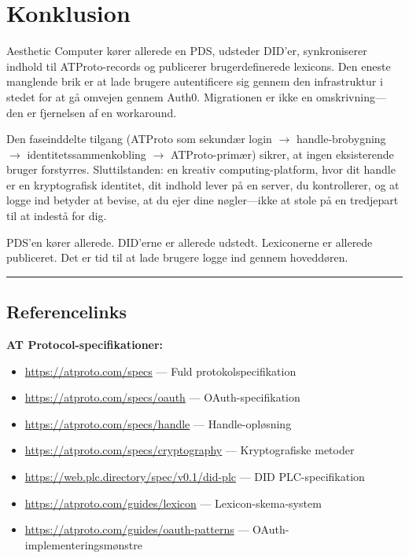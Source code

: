 \documentclass[10pt,letterpaper,twocolumn]{article}
\begin{document}
\section{Konklusion}

Aesthetic Computer kører allerede en PDS, udsteder DID'er, synkroniserer indhold til ATProto-records og publicerer brugerdefinerede lexicons. Den eneste manglende brik er at lade brugere autentificere sig gennem den infrastruktur i stedet for at gå omvejen gennem Auth0. Migrationen er ikke en omskrivning---den er fjernelsen af en workaround.

Den faseinddelte tilgang (ATProto som sekundær login $\to$ handle-brobygning $\to$ identitetssammenkobling $\to$ ATProto-primær) sikrer, at ingen eksisterende bruger forstyrres. Sluttilstanden: en kreativ computing-platform, hvor dit handle er en kryptografisk identitet, dit indhold lever på en server, du kontrollerer, og at logge ind betyder at bevise, at du ejer dine nøgler---ikke at stole på en tredjepart til at indestå for dig.

PDS'en kører allerede. DID'erne er allerede udstedt. Lexiconerne er allerede publiceret. Det er tid til at lade brugere logge ind gennem hoveddøren.


\vspace{0.5em}
\noindent\rule{\columnwidth}{0.5pt}

\subsection*{Referencelinks}

\noindent\small

\textbf{AT Protocol-specifikationer:}
\begin{itemize}
  \item \url{https://atproto.com/specs} --- Fuld protokolspecifikation
  \item \url{https://atproto.com/specs/oauth} --- OAuth-specifikation
  \item \url{https://atproto.com/specs/handle} --- Handle-opløsning
  \item \url{https://atproto.com/specs/cryptography} --- Kryptografiske metoder
  \item \url{https://web.plc.directory/spec/v0.1/did-plc} --- DID PLC-specifikation
  \item \url{https://atproto.com/guides/lexicon} --- Lexicon-skema-system
  \item \url{https://atproto.com/guides/oauth-patterns} --- OAuth-implementeringsmønstre
\end{itemize}
\end{document}
